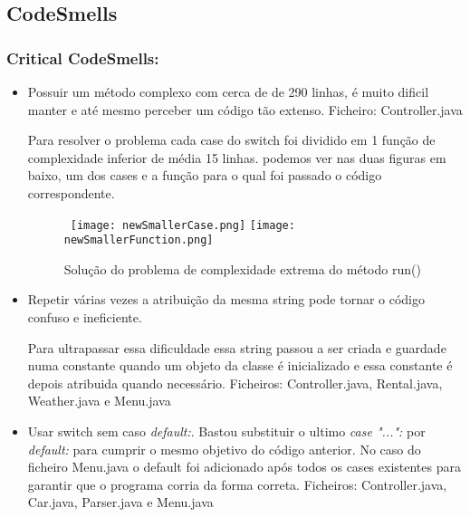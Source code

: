 \subsection{CodeSmells}

\subsubsection{Critical CodeSmells:}
\begin{itemize}
\item Possuir um método complexo com cerca de de 290 linhas, é muito dificil manter e até mesmo perceber um código tão extenso.\newline
 Ficheiro: Controller.java\newline

\par Para resolver o problema cada case do switch foi dividido em 1 função de complexidade inferior de média 15 linhas. podemos ver nas duas figuras em baixo, um dos cases e a função para o qual foi passado o código correspondente.

\begin{figure}[H]

  \hbox{\hspace{+1em}  \texttt{[image: newSmallerCase.png]}}
  \centering
  \texttt{[image: newSmallerFunction.png]}
  \caption {Solução do problema de complexidade extrema do método run()}

  \label {fig10}

\end{figure}
\end{itemize}

\begin{itemize}
\item Repetir várias vezes a atribuição da mesma string pode tornar o código confuso e ineficiente. \newline
\par Para ultrapassar essa dificuldade essa string passou a ser criada e guardade numa constante quando um objeto da classe é inicializado e essa constante é depois atribuida quando necessário. \newline
 Ficheiros: Controller.java, Rental.java, Weather.java e Menu.java\newline
\end{itemize}

\begin{itemize}
\item Usar switch sem caso \textit{default:}. Bastou substituir o ultimo \textit{case "...":} por \textit{default:} para cumprir o mesmo objetivo do código anterior. No caso do ficheiro Menu.java o default foi adicionado após todos os cases existentes para garantir que o programa corria da forma correta.\newline
 Ficheiros: Controller.java, Car.java, Parser.java e Menu.java\newline
\end{itemize}

